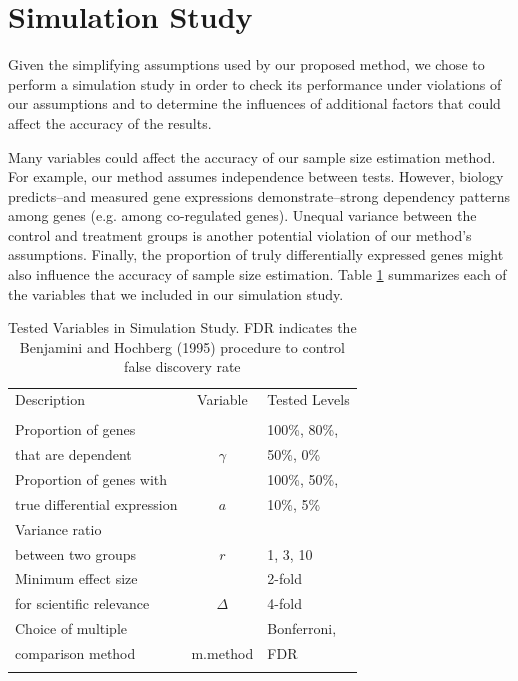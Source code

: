 \documentclass[12pt]{article}
\begin{document}
\section{Simulation Study}

Given the simplifying assumptions used by our proposed method, we
chose to perform a simulation study in order to check its
performance under violations of our assumptions and to determine the
influences of additional factors that could affect the accuracy of
the results.

Many variables could affect the accuracy of our sample size
estimation method. For example, our method assumes independence
between tests. However, biology predicts--and measured gene
expressions demonstrate--strong dependency patterns among genes
(e.g. among co-regulated genes).  Unequal variance between the
control and treatment groups is another potential violation of our
method's assumptions. Finally, the proportion of truly
differentially expressed genes might also influence the accuracy of
sample size estimation.  Table \ref{tb:SimuVariables} summarizes
each of the variables that we included in our simulation study.

\begin{table}
  \caption{Tested Variables in Simulation Study.
	FDR indicates the Benjamini and Hochberg
	(1995) procedure to  
	control false discovery rate}
  \label{tb:SimuVariables}
  \centering
  \vspace{0.1in}
  \begin{tabular}{lcl}
    Description & Variable & Tested Levels \\
    \\
    \hline\hline
    Proportion of genes &          & 100\%, 80\%,  \\
    that are dependent  & $\gamma$ & 50\%,   0\%    \\
    \hline
    Proportion of genes with     &     &  100\%, 50\%,\\
    true differential expression & $a$ &   10\%,  5\% \\
    \hline
    Variance ratio &  &\\
    between two groups & $r$ & 1, 3, 10  \\
    \hline
    Minimum effect size  & &2-fold \\
    for scientific relevance & $\Delta$ & 4-fold \\
    \hline
    Choice of multiple  & & Bonferroni,  \\
    comparison method & m.method & FDR \\
    \hline\hline\\
  \end{tabular}
\end{table}
\end{document}
